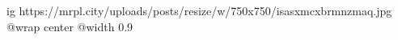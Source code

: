  
 
 
 
 

\ifcmt
  ig https://mrpl.city/uploads/posts/resize/w/750x750/isasxmcxbrmnzmaq.jpg
  @wrap center
  @width 0.9
\fi
